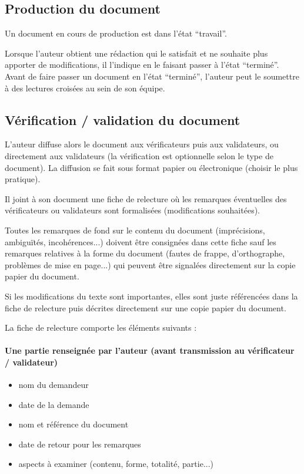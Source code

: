 \documentclass[a4paper]{article}
\begin{document}

\subsection{Production du document}

Un document en cours de production est dans l'état ``travail''.

Lorsque l'auteur obtient une rédaction qui le satisfait et ne souhaite plus apporter de modifications, il l'indique en le faisant passer à l'état ``terminé''.
Avant de faire passer un document en l'état ``terminé'', l'auteur peut le soumettre à des lectures croisées au sein de son équipe.

\subsection{Vérification / validation du document}

L'auteur diffuse alors le document aux vérificateurs puis aux validateurs, ou directement aux validateurs (la vérification est optionnelle selon le type de document). La diffusion se fait sous format papier ou électronique (choisir le plus pratique).

Il joint à son document une fiche de relecture où les remarques éventuelles des vérificateurs ou validateurs sont formalisées (modifications souhaitées).

Toutes les remarques de fond sur le contenu du document (imprécisions, ambiguïtés, incohérences...) doivent être consignées dans cette fiche sauf les remarques relatives à la forme du document (fautes de frappe, d'orthographe, problèmes de mise en page...) qui peuvent être signalées directement sur la copie papier du document.

Si les modifications du texte sont importantes, elles sont juste référencées dans la fiche de relecture puis décrites directement sur une copie papier du document.

La fiche de relecture comporte les éléments suivants : 

\paragraph{Une partie renseignée par l'auteur (avant transmission au vérificateur / validateur)}

\begin{itemize}
\item nom du demandeur
\item date de la demande
\item nom et référence du document
\item date de retour pour les remarques
\item aspects à examiner (contenu, forme, totalité, partie...)
\end{itemize}
\end{document}
